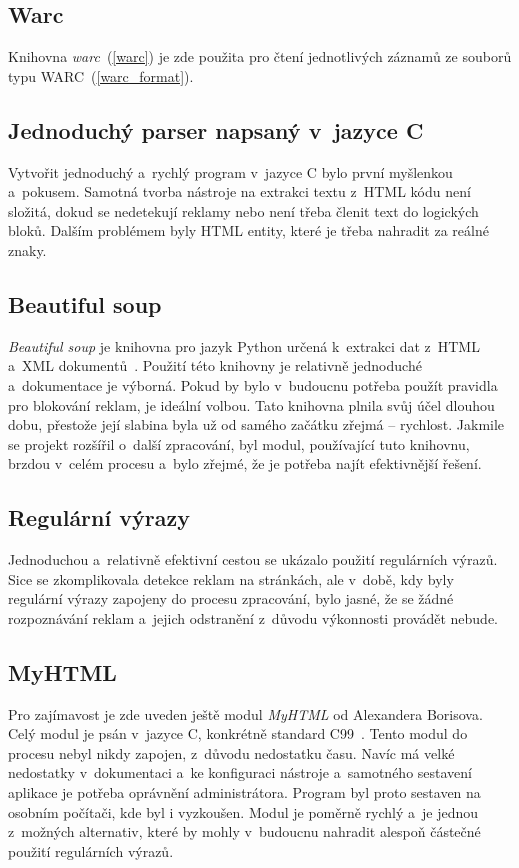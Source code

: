 \subsection{Warc}
Knihovna \textit{warc}~(\ref{warc}) je zde použita pro čtení jednotlivých záznamů ze souborů typu WARC~(\ref{warc_format}).

\subsection{Jednoduchý parser napsaný v~jazyce C}
Vytvořit jednoduchý a~rychlý program v~jazyce C bylo první myšlenkou a~pokusem. Samotná tvorba
nástroje na extrakci textu z~HTML kódu není složitá, dokud se nedetekují reklamy nebo není třeba
členit text do logických bloků. Dalším problémem byly HTML entity, které je třeba nahradit za reálné znaky.

\subsection{Beautiful soup}
\textit{Beautiful soup} je knihovna pro jazyk Python určená k~extrakci dat z~HTML a~XML dokumentů~\cite{BEATIFULSOUP}.
Použití této knihovny je relativně jednoduché a~dokumentace je výborná. Pokud by bylo v~budoucnu potřeba použít pravidla pro
blokování reklam, je ideální volbou. Tato knihovna plnila svůj účel dlouhou dobu, přestože její slabina byla už od samého začátku
zřejmá -- rychlost. Jakmile se projekt rozšířil o~další zpracování, byl modul, používající tuto knihovnu, brzdou v~celém procesu
a~bylo zřejmé, že je potřeba najít efektivnější řešení.

\subsection{Regulární výrazy}
Jednoduchou a~relativně efektivní cestou se ukázalo použití regulárních výrazů. Sice se zkomplikovala detekce reklam na stránkách,
ale v~době, kdy byly regulární výrazy zapojeny do procesu zpracování, bylo jasné, že se žádné rozpoznávání reklam
a~jejich odstranění z~důvodu výkonnosti provádět nebude.

\subsection{MyHTML}
Pro zajímavost je zde uveden ještě modul \textit{MyHTML} od Alexandera Borisova. Celý modul je psán v~jazyce C,
konkrétně standard C99~\cite{MyHTML}. Tento modul do procesu nebyl nikdy zapojen, z~důvodu nedostatku času. Navíc má
velké nedostatky v~dokumentaci a~ke konfiguraci nástroje a~samotného sestavení aplikace je
potřeba oprávnění administrátora. Program byl proto sestaven na osobním počítači, kde byl i vyzkoušen. Modul je poměrně rychlý
a~je jednou z~možných alternativ, které by mohly v~budoucnu nahradit alespoň částečné použití regulárních výrazů.

